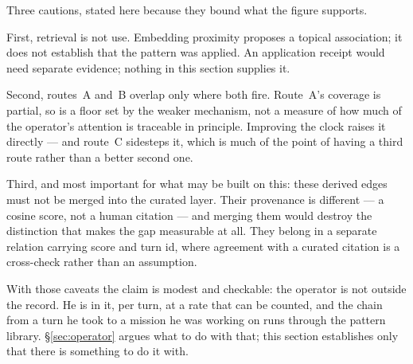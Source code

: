 Three cautions, stated here because they bound what the figure supports.

First, retrieval is not use. Embedding proximity proposes a topical association; it does not establish
that the pattern was applied. An application receipt would need separate evidence; nothing in this
section supplies it.

Second, routes~A and~B overlap only where both fire. Route~A's coverage is
partial, so \ChainTurns{} is a floor set by the weaker mechanism, not a measure
of how much of the operator's attention is traceable in principle. Improving the
clock raises it directly --- and route~C sidesteps it, which is much of the point
of having a third route rather than a better second one.

Third, and most important for what may be built on this: these derived edges
must not be merged into the curated layer. Their provenance is different --- a
cosine score, not a human citation --- and merging them would destroy the
distinction that makes the gap measurable at all. They belong in a separate
relation carrying score and turn id, where agreement with a curated citation is
a cross-check rather than an assumption.

With those caveats the claim is modest and checkable: the operator is not
outside the record. He is in it, per turn, at a rate that can be counted, and
the chain from a turn he took to a mission he was working on runs through the
pattern library. \S\ref{sec:operator} argues what to do with that; this section
establishes only that there is something to do it with.

